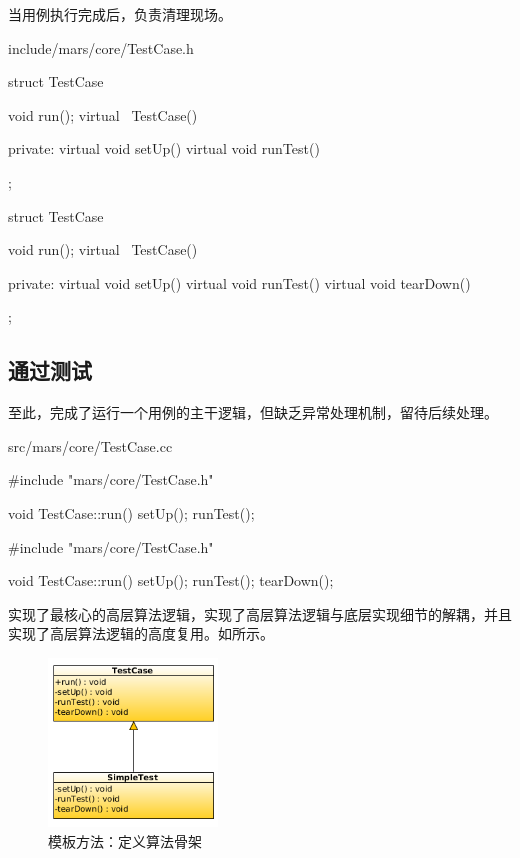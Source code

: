 \begin{content}
当用例执行完成后，负责清理现场。

\begin{diff}{include/mars/core/TestCase.h}
 \begin{minicpp}
struct TestCase {
  void run();
  virtual ~TestCase() {}

private:
  virtual void setUp() {}
  virtual void runTest() {}
};
  \end{minicpp}
\tcblower
 \begin{minicpp}
struct TestCase {
  void run();
  virtual ~TestCase() {}

private:
  virtual void setUp() {}
  virtual void runTest() {}
  virtual void tearDown() {}
};
  \end{minicpp}
\end{diff}

\subsection{通过测试}

至此，完成了运行一个用例的主干逻辑，但缺乏异常处理机制，留待后续处理。

\begin{diff}{src/mars/core/TestCase.cc}
 \begin{minicpp}
#include "mars/core/TestCase.h"

void TestCase::run() {
  setUp();
  runTest();
}
  \end{minicpp}
\tcblower
 \begin{minicpp}
#include "mars/core/TestCase.h"

void TestCase::run() {
  setUp();
  runTest();
  tearDown();
}
  \end{minicpp}
\end{diff}

实现了最核心的高层算法逻辑，实现了高层算法逻辑与底层实现细节的解耦，并且实现了高层算法逻辑的高度复用。如所示。

\begin{figure}[H]
\centering
\includegraphics[width=0.4\textwidth]{figures/xunit/simple-test.png}
\caption{模板方法：定义算法骨架}
 \label{fig:simple-test}
\end{figure}


\end{content}
